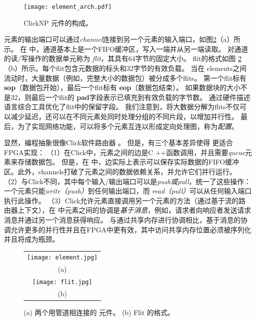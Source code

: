\begin{figure}
\centering
\texttt{[image: element\_arch.pdf]}
\caption{ClickNP 元件的构成。}
\label{clicknp:fig:element_arch}
\end{figure}

元素的输出端口可以通过\textit {channel}连接到另一个元素的输入端口，如图\ref {clicknp:fig:element}（a）所示。
在 \name 中，通道基本上是一个FIFO缓冲区，写入一端并从另一端读取。
对通道的读/写操作的数据单元称为 \textit {flit}，其具有64字节的固定大小。
flit的格式如图 \ref {clicknp:fig:element}（b）所示。每个flit包含元数据的标头和32字节的有效负载。
当在 \name elements之间流动时，大量数据（例如，完整大小的数据包）被分成多个flits。
第一个flit标有 \textbf {sop}（数据包开始），最后一个flit标有 \textbf {eop}（数据包结束）。
如果数据块的大小不是32，则最后一个flit的 \textbf {pad}字段表示已填充到有效负载的字节数。
通过硬件描述语言综合工具优化了flit中的保留字段。
我们注意到，将大数据分解为flits不仅可以减少延迟，还可以在不同元素处同时处理分组的不同片段，以增加并行性。
最后，为了实现网络功能，可以将多个\name 元素互连以形成定向处理图，称为\name \textit {配置}。

显然，\name 编程抽象很像Click软件路由器 \cite {kohler2000click}。
但是，有三个基本差异使得 \name 更适合FPGA实现：
（1）在Click中，元素之间的边是C ++函数调用，并且需要\textit {queue}元素来存储数据包。
但是，在 \name 中，边实际上表示可以保存实际数据的FIFO缓冲区。此外，\name  channels打破了元素之间的数据依赖关系，并允许它们并行运行。
（2）与Click不同，其中每个输入/输出端口可以是\textit {push或pull}，\name 统一了这些操作：一个元素只能\textit {write（push）}到任何输出端口，而 \textit {read（pull）}可以从任何输入端口执行此操作。
（3）Click允许元素直接调用另一个元素的方法（通过基于流的路由器上下文），在 \name 中元素之间的协调是\textit {基于消息}，例如，请求者向响应者发送请求消息并通过另一个消息获得响应。
与通过共享内存进行协调相比，基于消息的协调允许更多的并行性并且在FPGA中更有效，其中访问共享内存位置必须被序列化并且将成为瓶颈。
\begin{figure}
\centering
\begin{tabular}{c}
\texttt{[image: element.jpg]}  \\
(a)\\
\texttt{[image: flit.jpg]} \\
(b) \\
\end{tabular}

\caption{(a) 两个用管道相连接的 \name 元件。 (b) Flit 的格式。}
\label{clicknp:fig:element}

\end{figure}

